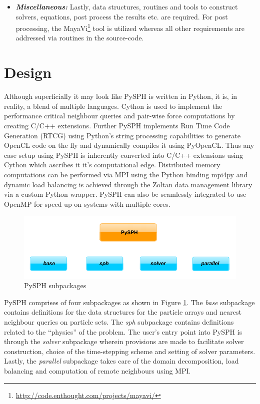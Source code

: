 \begin{itemize}
\item \textbf{\textit{Miscellaneous: }}Lastly, data structures, routines and tools to construct solvers, equations, post process the results etc. are required. For post processing, the MayaVi\footnote[7]{\url{http://code.enthought.com/projects/mayavi/}} tool is utilized whereas all other requirements are addressed via routines in the source-code.
\end{itemize} 

\section{Design}\label{sec:pysph_design}

Although superficially it may look like PySPH is written in Python, it is, in reality, a blend of multiple languages. Cython is used to implement the performance critical neighbour queries and pair-wise force computations by creating C/C++ extensions. Further PySPH implements Run Time Code Generation (RTCG) using Python's string processing capabilities to generate OpenCL code on the fly and dynamically compiles it using PyOpenCL\cite{PyOpenCL}. Thus any case setup using PySPH is inherently converted into C/C++ extensions using Cython which ascribes it it's computational edge. Distributed memory computations can be performed via MPI using the Python binding mpi4py \cite{mpi4py} and dynamic load balancing is achieved through the Zoltan data management library \cite{zoltan} via a custom Python wrapper. PySPH can also be seamlessly integrated to use OpenMP for speed-up on systems with multiple cores.

\begin{figure}[htb!]
\centering
\setlength\fboxsep{0pt}
      \includegraphics[scale=0.35]{figures/pysph_modules.png} 
\caption{{\small{PySPH subpackages}}}
\label{fig:pysph_modules}
\end{figure}

PySPH comprises of four subpackages as shown in Figure \ref{fig:pysph_modules}. The \textit{base} subpackage contains definitions for the data structures for the particle arrays and nearest neighbour queries on particle sets. The \textit{sph} subpackage contains definitions related to the ``physics'' of the problem. The user's entry point into PySPH is through the  \textit{solver} subpackage wherein provisions are made to facilitate solver construction, choice of the time-stepping scheme and setting of solver parameters. Lastly, the \textit{parallel} subpackage takes care of the domain decomposition, load balancing and computation of remote neighbours using MPI.

